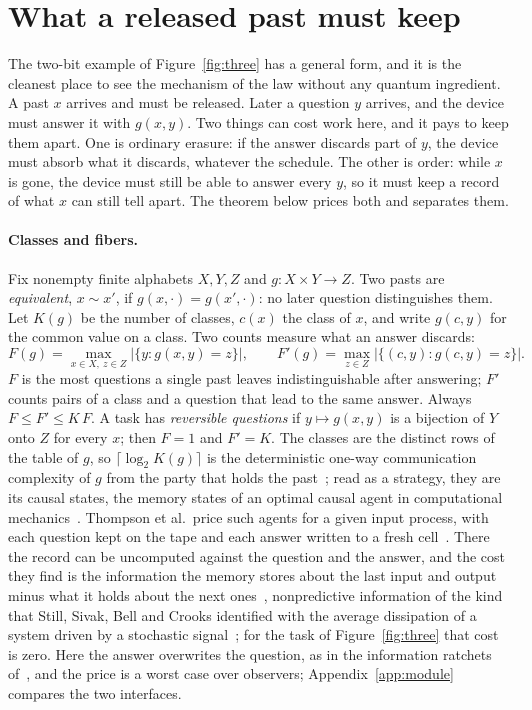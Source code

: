 \section{What a released past must keep}\label{sec:classes}

The two-bit example of Figure~\ref{fig:three} has a general form, and it is the cleanest place to see the mechanism of the law without any quantum ingredient. A past $x$ arrives and must be released. Later a question $y$ arrives, and the device must answer it with $g(x,y)$. Two things can cost work here, and it pays to keep them apart. One is ordinary erasure: if the answer discards part of $y$, the device must absorb what it discards, whatever the schedule. The other is order: while $x$ is gone, the device must still be able to answer every $y$, so it must keep a record of what $x$ can still tell apart. The theorem below prices both and separates them.

\paragraph{Classes and fibers.} Fix nonempty finite alphabets $X,Y,Z$ and $g:X\times Y\to Z$. Two pasts are \emph{equivalent}, $x\sim x'$, if $g(x,\cdot)=g(x',\cdot)$: no later question distinguishes them. Let $K(g)$ be the number of classes, $c(x)$ the class of $x$, and write $g(c,y)$ for the common value on a class. Two counts measure what an answer discards:
\[
F(g)=\max_{x\in X,\ z\in Z}\bigl|\{y:g(x,y)=z\}\bigr|,
\qquad
F'(g)=\max_{z\in Z}\bigl|\{(c,y):g(c,y)=z\}\bigr| .
\]
$F$ is the most questions a single past leaves indistinguishable after answering; $F'$ counts pairs of a class and a question that lead to the same answer. Always $F\le F'\le K\,F$. A task has \emph{reversible questions} if $y\mapsto g(x,y)$ is a bijection of $Y$ onto $Z$ for every $x$; then $F=1$ and $F'=K$. The classes are the distinct rows of the table of $g$, so $\lceil\log_2K(g)\rceil$ is the deterministic one-way communication complexity of $g$ from the party that holds the past~\cite{KushilevitzNisan96}; read as a strategy, they are its causal states, the memory states of an optimal causal agent in computational mechanics~\cite{BarnettCrutchfield15,Thompson25}. Thompson et al.\ price such agents for a given input process, with each question kept on the tape and each answer written to a fresh cell~\cite{Thompson25}. There the record can be uncomputed against the question and the answer, and the cost they find is the information the memory stores about the last input and output minus what it holds about the next ones~\cite[Eq.~(3)]{Thompson25}, nonpredictive information of the kind that Still, Sivak, Bell and Crooks identified with the average dissipation of a system driven by a stochastic signal~\cite{Still12}; for the task of Figure~\ref{fig:three} that cost is zero. Here the answer overwrites the question, as in the information ratchets of~\cite{BMC18}, and the price is a worst case over observers; Appendix~\ref{app:module} compares the two interfaces.

